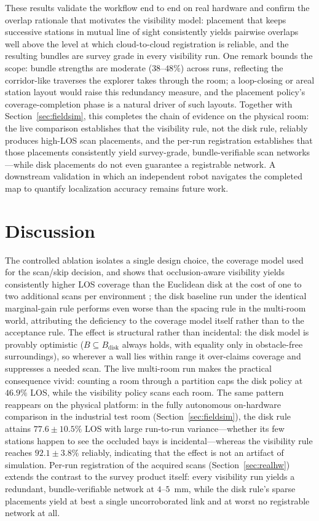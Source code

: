 \documentclass[sensors,article,submit,pdftex,moreauthors]{Definitions/mdpi}
\providecommand{\DIFadd}[1]{{\protect\color{blue} \sf #1}} %
\providecommand{\DIFaddbegin}{} %
\providecommand{\DIFaddend}{} %
\begin{document}
These results validate the workflow end to end on real hardware and confirm the
overlap rationale that motivates the visibility model: placement that keeps
successive stations in mutual line of sight consistently yields pairwise
overlaps well above the level at which cloud-to-cloud registration is reliable,
and the resulting bundles are survey grade in every visibility run. One remark
bounds the scope: bundle strengths are moderate ($38$--$48\%$) across runs,
reflecting the corridor-like traverses the explorer takes through the room; a
loop-closing or areal station layout would raise this redundancy measure, and
the placement policy's coverage-completion phase is a natural driver of such
layouts. Together with Section~\ref{sec:fieldsim}, this completes the chain of
evidence on the physical room: the live comparison establishes that the
visibility rule, not the disk rule, reliably produces high-LOS scan placements,
and the per-run registration establishes that those placements consistently
yield survey-grade, bundle-verifiable scan networks---while disk placements do
not even guarantee a registrable network. A downstream validation in which an
independent robot navigates the completed map to quantify localization accuracy
remains future work.

\section{Discussion}
\label{sec:discussion}

The controlled ablation isolates a single design choice, the coverage model used
for the scan/skip decision, and shows that occlusion-aware visibility yields
consistently higher LOS coverage than the Euclidean disk at the cost of one to
two additional scans per environment\DIFaddbegin \DIFadd{; the disk baseline run under the identical
marginal-gain rule performs even worse than the spacing rule in the multi-room
world, attributing the deficiency to the coverage model itself rather than to
the acceptance rule}\DIFaddend . The effect is structural rather than incidental:
the disk model is provably optimistic ($B\subseteq B_{\mathrm{disk}}$ always
holds, with equality only in obstacle-free surroundings), so wherever a wall lies within
range it over-claims coverage and suppresses a needed scan. The live multi-room
run makes the practical consequence vivid: counting a room through a partition
caps the disk policy at $46.9\%$ LOS, while the visibility policy scans each room.
The same pattern reappears on the physical platform: in the fully autonomous
on-hardware comparison in the industrial test room (Section~\ref{sec:fieldsim}),
the disk rule attains $77.6\pm10.5\%$ LOS with large run-to-run variance---whether
its few stations happen to see the occluded bays is incidental---whereas the
visibility rule reaches $92.1\pm3.8\%$ reliably, indicating that the effect is
not an artifact of simulation. Per-run registration of the acquired scans
(Section~\ref{sec:realhw}) extends the contrast to the survey product itself:
every visibility run yields a redundant, bundle-verifiable network at
$4$--$5$~mm, while the disk rule's sparse placements yield at best a single
uncorroborated link and at worst no registrable network at all.
\end{document}
